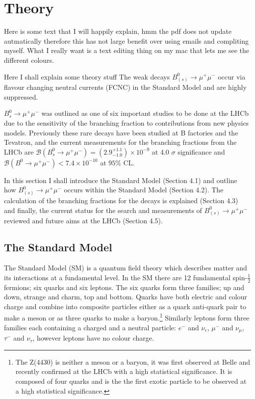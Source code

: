 

\chapter{Theory}


Here is some text that I will happily explain, hmm the pdf does not update autmatically therefore this has not large benefit over using emails and compliting myself. What I really want is a text editing thing on my mac that lets me see the different colours.

Here I shall explain some theory stuff
The weak decays $B_{(s)}^{0} \to \mu^{+} \mu^{-}$ occur via flavour changing neutral currents (FCNC) in the Standard Model and are highly suppressed. 


$B_{s}^{0} \to \mu^{+} \mu^{-}$ was outlined as one of six important studies to be done at the LHCb \cite{RoadMap} due to the sensitivity of the branching fraction to contributions from new physics models.
Previously these rare decays have been studied at B factories and the Tevatron, and the current measurements for the branching fractions from the LHCb are 
$ \mathcal{B}(B_{s}^{0} \to \mu^{+} \mu^{-})  = (2.9_{-1.0}^{+1.1})\times 10^{-9}$ at 4.0 $\sigma$ significance and $ \mathcal{B}(B^{0} \to \mu^{+} \mu^{-}) < 7.4 \times 10^{-10}$ at $95\%$ CL.

In this section I shall introduce the Standard Model (Section 4.1) and outline how $B_{(s)}^{0} \to \mu^{+} \mu^{-}$ occurs within the Standard Model (Section 4.2). 
The calculation of the branching fractions for the decays is explained (Section 4.3) and finally, the current 
status for the search and measurements of  $B_{(s)}^{0} \to \mu^{+} \mu^{-}$ reviewed and future aims at the LHCb (Section 4.5).



\section{The Standard Model}

The Standard Model (SM) is a quantum field theory which describes matter and its interactions at a fundamental level. In the SM there are 12 fundamental spin-$\frac{1}{2}$ fermions; six quarks and six leptons. The six quarks form three families; up and down, strange and charm, top and bottom. Quarks have both electric and colour charge and combine into composite
particles either as a quark anti-quark pair to make a meson or as three quarks to make a baryon.\footnote{The Z(4430) is neither a meson or a baryon, it was first observed at Belle \cite{Choi:2007wga} and recently confirmed at the LHCb \cite{Aaij:2014jqa} with a 
high statistical significance. It is composed of four quarks and is the the first exotic particle to be observed at a high statistical significance.} Similarly leptons form three families each containing a charged and a neutral particle: $e^{-}$ 
and $\nu_{e}$, $\mu^{-}$ and $\nu_{\mu}$, $\tau^{-}$ and $\nu_{\tau}$, however leptons have no colour charge. 

